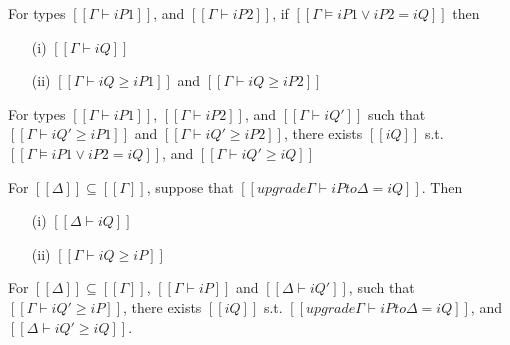 \begin{lemma}
  For types $[[Γ ⊢ iP1]]$, and $[[Γ ⊢ iP2]]$,
  if $[[Γ ⊨ iP1 ∨ iP2 = iQ]]$ then
  \begin{enumerate}
    \item[(i)]  $[[Γ ⊢ iQ]]$
    \item[(ii)] $[[Γ ⊢ iQ ≥ iP1]]$ and $[[Γ ⊢ iQ ≥ iP2]]$
  \end{enumerate}
\end{lemma}

\begin{lemma}
  For types $[[Γ ⊢ iP1]]$, $[[Γ ⊢ iP2]]$, and $[[Γ ⊢ iQ']]$
  such that $[[Γ ⊢ iQ' ≥ iP1]]$ and $[[Γ ⊢ iQ' ≥ iP2]]$,
  there exists $[[iQ]]$ s.t. $[[Γ ⊨ iP1 ∨ iP2 = iQ]]$, and
  $[[Γ ⊢ iQ' ≥ iQ]]$
\end{lemma}

\begin{lemma}
  For $[[Δ]] \subseteq [[Γ]]$,
  suppose that $[[upgrade Γ ⊢ iP to Δ = iQ]]$.
  Then
  \begin{enumerate}
    \item [(i)] $[[Δ ⊢ iQ]]$
    \item [(ii)] $[[Γ ⊢ iQ ≥ iP]]$
  \end{enumerate}
\end{lemma}

\begin{lemma}
  For $[[Δ]] \subseteq [[Γ]]$,
  $[[Γ ⊢ iP]]$ and $[[Δ ⊢ iQ']]$,
  such that $[[Γ ⊢ iQ' ≥ iP]]$,
  there exists $[[iQ]]$ s.t.
  $[[upgrade Γ ⊢ iP to Δ = iQ]]$, and
  $[[Δ ⊢ iQ' ≥ iQ]]$.
\end{lemma}


